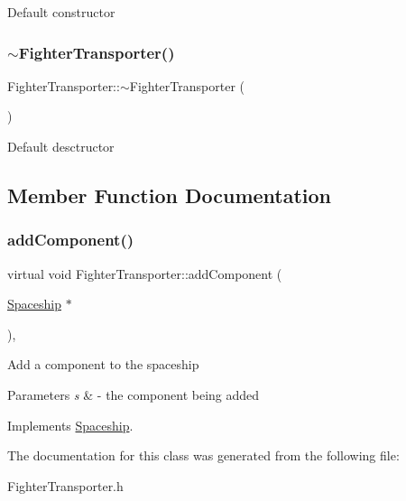 Default constructor \mbox{\label{classFighterTransporter_a65a48b07df846737c605337f69998eef}} 
\subsubsection{\texorpdfstring{$\sim$\+Fighter\+Transporter()}{~FighterTransporter()}}
{\footnotesize\ttfamily Fighter\+Transporter\+::$\sim$\+Fighter\+Transporter (\begin{DoxyParamCaption}{ }\end{DoxyParamCaption})\hspace{0.3cm}{\ttfamily [inline]}}

Default desctructor 

\subsection{Member Function Documentation}
\mbox{\label{classFighterTransporter_a2c001243993307f51abba10636c0fbb9}} 
\subsubsection{\texorpdfstring{add\+Component()}{addComponent()}}
{\footnotesize\ttfamily virtual void Fighter\+Transporter\+::add\+Component (\begin{DoxyParamCaption}\item[{\hyperlink{classSpaceship}{Spaceship} $\ast$}]{ }\end{DoxyParamCaption})\hspace{0.3cm}{\ttfamily [inline]}, {\ttfamily [virtual]}}

Add a component to the spaceship 
\begin{DoxyParams}{Parameters}
{\em s} & -\/ the component being added \\
\hline
\end{DoxyParams}


Implements \hyperlink{classSpaceship_ac1b4673a691cd100708ddea08cd9f192}{Spaceship}.



The documentation for this class was generated from the following file\+:\begin{DoxyCompactItemize}
\item 
Fighter\+Transporter.\+h\end{DoxyCompactItemize}
